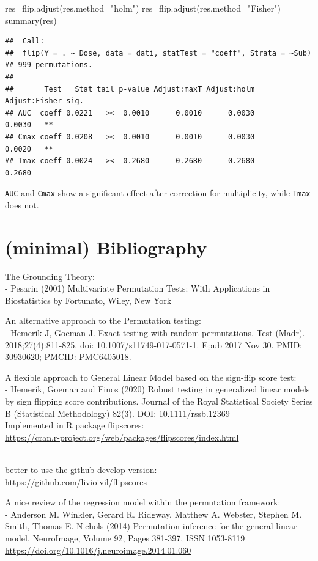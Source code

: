 \documentclass[
]{article}
\newenvironment{Shaded}{\begin{snugshade}}{\end{snugshade}}
\newcommand{\AttributeTok}[1]{\textcolor[rgb]{0.77,0.63,0.00}{#1}}
\newcommand{\FunctionTok}[1]{\textcolor[rgb]{0.00,0.00,0.00}{#1}}
\newcommand{\NormalTok}[1]{#1}
\newcommand{\OtherTok}[1]{\textcolor[rgb]{0.56,0.35,0.01}{#1}}
\newcommand{\StringTok}[1]{\textcolor[rgb]{0.31,0.60,0.02}{#1}}
\begin{document}
\begin{Shaded}
\begin{Highlighting}[]
\NormalTok{res}\OtherTok{=}\FunctionTok{flip.adjust}\NormalTok{(res,}\AttributeTok{method=}\StringTok{"holm"}\NormalTok{)}
\NormalTok{res}\OtherTok{=}\FunctionTok{flip.adjust}\NormalTok{(res,}\AttributeTok{method=}\StringTok{"Fisher"}\NormalTok{)}
\FunctionTok{summary}\NormalTok{(res)}
\end{Highlighting}
\end{Shaded}

\begin{verbatim}
##  Call:
##  flip(Y = . ~ Dose, data = dati, statTest = "coeff", Strata = ~Sub) 
## 999 permutations.
## 
##       Test   Stat tail p-value Adjust:maxT Adjust:holm Adjust:Fisher sig.
## AUC  coeff 0.0221   ><  0.0010      0.0010      0.0030        0.0030   **
## Cmax coeff 0.0208   ><  0.0010      0.0010      0.0030        0.0020   **
## Tmax coeff 0.0024   ><  0.2680      0.2680      0.2680        0.2680
\end{verbatim}

\texttt{AUC} and \texttt{Cmax} show a significant effect after
correction for multiplicity, while \texttt{Tmax} does not.

\hypertarget{minimal-bibliography}{%
\section{(minimal) Bibliography}\label{minimal-bibliography}}

The Grounding Theory:\\
- Pesarin (2001) Multivariate Permutation Tests: With Applications in
Biostatistics by Fortunato, Wiley, New York

An alternative approach to the Permutation testing:\\
- Hemerik J, Goeman J. Exact testing with random permutations. Test
(Madr). 2018;27(4):811-825. doi: 10.1007/s11749-017-0571-1. Epub 2017
Nov 30. PMID: 30930620; PMCID: PMC6405018.

A flexible approach to General Linear Model based on the sign-flip score
test:\\
- Hemerik, Goeman and Finos (2020) Robust testing in generalized linear
models by sign flipping score contributions. Journal of the Royal
Statistical Society Series B (Statistical Methodology) 82(3). DOI:
10.1111/rssb.12369\\
Implemented in R package flipscores:\\
\url{https://cran.r-project.org/web/packages/flipscores/index.html}\strut \\
better to use the github develop version:\\
\url{https://github.com/livioivil/flipscores}

A nice review of the regression model within the permutation
framework:\\
- Anderson M. Winkler, Gerard R. Ridgway, Matthew A. Webster, Stephen M.
Smith, Thomas E. Nichols (2014) Permutation inference for the general
linear model, NeuroImage, Volume 92, Pages 381-397, ISSN 1053-8119
\url{https://doi.org/10.1016/j.neuroimage.2014.01.060}
\end{document}
